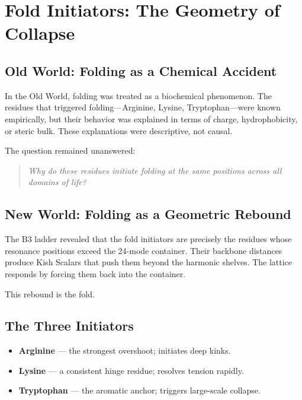 \documentclass[11pt, letterpaper, openany]{book}
\begin{document}

\section{Fold Initiators: The Geometry of Collapse}

\subsection*{Old World: Folding as a Chemical Accident}

In the Old World, folding was treated as a biochemical phenomenon. The residues
that triggered folding---Arginine, Lysine, Tryptophan---were known empirically,
but their behavior was explained in terms of charge, hydrophobicity, or steric
bulk. These explanations were descriptive, not causal.

The question remained unanswered:

\begin{quote}
\textit{Why do these residues initiate folding at the same positions across all
domains of life?}
\end{quote}

\subsection*{New World: Folding as a Geometric Rebound}

The B3 ladder revealed that the fold initiators are precisely the residues whose
resonance positions exceed the 24-mode container. Their backbone distances
produce Kish Scalars that push them beyond the harmonic shelves. The lattice
responds by forcing them back into the container.

This rebound is the fold.

\subsection*{The Three Initiators}

\begin{itemize}
    \item \textbf{Arginine} — the strongest overshoot; initiates deep kinks.
    \item \textbf{Lysine} — a consistent hinge residue; resolves tension rapidly.
    \item \textbf{Tryptophan} — the aromatic anchor; triggers large-scale collapse.
\end{itemize}
\end{document}
